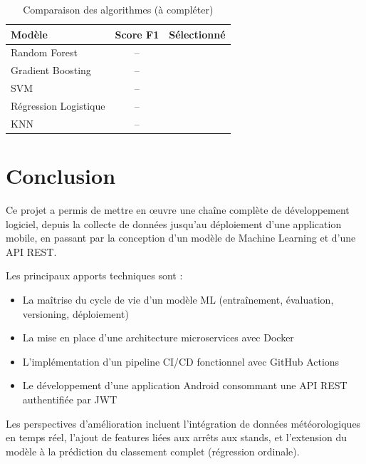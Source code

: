 \documentclass[12pt, a4paper]{article}
\begin{document}
\begin{table}[H]
\centering
\begin{tabular}{lcc}
\toprule
\textbf{Modèle} & \textbf{Score F1} & \textbf{Sélectionné} \\
\midrule
Random Forest       & -- & \\
Gradient Boosting   & -- & \\
SVM                 & -- & \\
Régression Logistique & -- & \\
KNN                 & -- & \\
\bottomrule
\end{tabular}
\caption{Comparaison des algorithmes (à compléter)}
\end{table}

\section{Conclusion}

Ce projet a permis de mettre en œuvre une chaîne complète de développement logiciel, depuis la collecte de données jusqu'au déploiement d'une application mobile, en passant par la conception d'un modèle de Machine Learning et d'une API REST.

Les principaux apports techniques sont :
\begin{itemize}
    \item La maîtrise du cycle de vie d'un modèle ML (entraînement, évaluation, versioning, déploiement)
    \item La mise en place d'une architecture microservices avec Docker
    \item L'implémentation d'un pipeline CI/CD fonctionnel avec GitHub Actions
    \item Le développement d'une application Android consommant une API REST authentifiée par JWT
\end{itemize}

Les perspectives d'amélioration incluent l'intégration de données météorologiques en temps réel, l'ajout de features liées aux arrêts aux stands, et l'extension du modèle à la prédiction du classement complet (régression ordinale).

\newpage
\end{document}
